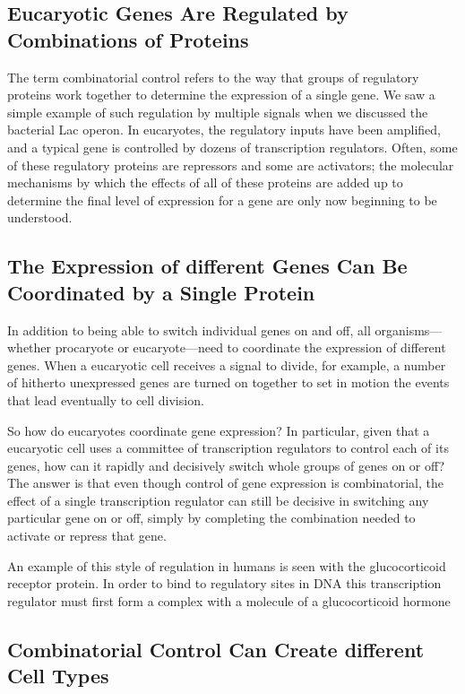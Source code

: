 \subsection{Eucaryotic Genes Are Regulated by Combinations of Proteins}

The term combinatorial control refers to the way that groups of regulatory 
proteins work together to determine the expression of a single gene.
We saw a simple example of such regulation by multiple signals when
we discussed the bacterial Lac operon. In eucaryotes, the
regulatory inputs have been amplified, and a typical gene is controlled
by dozens of transcription regulators. Often, some of these
regulatory proteins are repressors and some are activators; the molecular
mechanisms by which the effects of all of these proteins are added up to
determine the final level of expression for a gene are only now beginning
to be understood.

\subsection{The Expression of different Genes Can Be Coordinated by a Single Protein}

In addition to being able to switch individual genes on and off, all
organisms—whether procaryote or eucaryote—need to coordinate the
expression of different genes. When a eucaryotic cell receives a signal to
divide, for example, a number of hitherto unexpressed genes are turned
on together to set in motion the events that lead eventually to cell division.

So how do eucaryotes coordinate gene expression? In particular, given that a eucaryotic
cell uses a committee of transcription regulators to control each of its genes, 
how can it rapidly and decisively
switch whole groups of genes on or off? The answer is that even though
control of gene expression is combinatorial, the effect of a single transcription 
regulator can still be decisive in switching any particular gene
on or off, simply by completing the combination needed to activate or
repress that gene.

An example of this style of regulation in humans is seen with the glucocorticoid 
receptor protein. In order to bind to regulatory sites in DNA
this transcription regulator must first form a complex with a molecule
of a glucocorticoid hormone

\subsection{Combinatorial Control Can Create different Cell Types}

